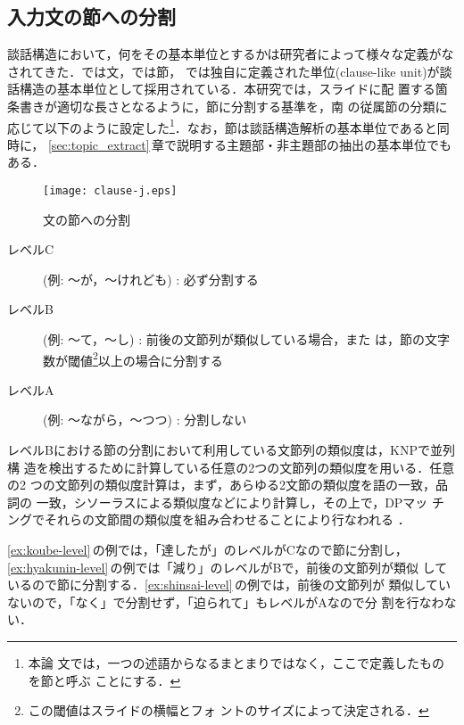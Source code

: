 \subsection{入力文の節への分割}
\label{subsec:divideintonodes}

談話構造において，何をその基本単位とするかは研究者によって様々な定義がな
されてきた．\cite{Polanyi88,Kurohashi94j}では文，\cite{Longacre83}では節，
\cite{Grosz86,Marcu99a,Marcu99b}では独自に定義された単位(clause-like
unit)が談話構造の基本単位として採用されている．本研究では，スライドに配
置する箇条書きが適切な長さとなるように，節に分割する基準を，南
\cite{Minami93}の従属節の分類に応じて以下のように設定した\footnote{本論
文では，一つの述語からなるまとまりではなく，ここで定義したものを節と呼ぶ
ことにする．}．なお，節は談話構造解析の基本単位であると同時に，
\ref{sec:topic_extract}\,章で説明する主題部・非主題部の抽出の基本単位でも
ある．

\begin{figure*}[t]
 \begin{center}
     \texttt{[image: clause-j.eps]}
\caption{文の節への分割}
\label{fig:discourse_unit}
 \end{center} 
\end{figure*}

\begin{description}
 \item [レベルC] (例: 〜が，〜けれども) : 必ず分割する
 \item [レベルB] (例: 〜て，〜し) : 前後の文節列が類似している場合，また
	     は，節の文字数が閾\linebreak[4]値\footnote{この閾値はスライドの横幅とフォ
	     ントのサイズによって決定される．}以上の場合に分割する
 \item [レベルA] (例: 〜ながら，〜つつ) : 分割しない 
\end{description}

レベルBにおける節の分割において利用している文節列の類似度は，KNPで並列構
造を検出するために計算している任意の2つの文節列の類似度を用いる．任意の2 
つの文節列の類似度計算は，まず，あらゆる2文節の類似度を語の一致，品詞の
一致，シソーラス\cite{NTT}による類似度などにより計算し，その上で，DPマッ
チングでそれらの文節間の類似度を組み合わせることにより行なわれる
\cite{KNP94}．

\ref{ex:koube-level}\,の例では，「達したが」のレベルがCなので節に分割し，
\ref{ex:hyakunin-level}\,の例では「減り」のレベルがBで，前後の文節列が類似
しているので節に分割する．\ref{ex:shinsai-level}\,の例では，前後の文節列が
類似していないので，「なく」で分割せず，「迫られて」もレベルがAなので分
割を行なわない．


